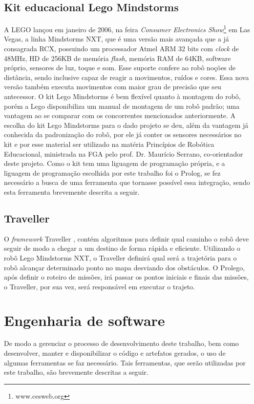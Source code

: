 \subsection{Kit educacional Lego Mindstorms}
A LEGO lançou em janeiro de 2006, na feira \textit{Consumer Electronics Show}\footnote{www.cesweb.org} em Las Vegas, a linha Mindstorms NXT, que é uma versão mais avançada que a já consagrada RCX, possuindo um processador Atmel ARM 32 bits com \textit{clock} de 48MHz, HD de 256KB de memória \textit{flash}, memória RAM de 64KB, software próprio, sensores de luz, toque e som. Esse suporte confere ao robô noções de distância, sendo inclusive capaz de reagir a movimentos, ruídos e cores. Essa nova versão também executa movimentos com maior grau de precisão que seu antecessor.
O kit Lego Mindstorms é bem flexível quanto à montagem do robô, porém a Lego disponibiliza um manual de montagem de um robô padrão; uma vantagem ao se comparar com os concorrentes mencionados anteriormente. 
A escolha do kit Lego Mindstorms para o dado projeto se deu, além da vantagem já conhecida da padronização do robô, por ele já conter os sensores necessários no kit e por esse material ser utilizado na matéria Princípios de Robótica Educacional, ministrada na FGA pelo prof. Dr. Maurício Serrano, co-orientador deste projeto. Como o kit tem uma liguagem de programação própria, e a liguagem de programação escolhida por este trabalho foi o Prolog, se fez necessário a busca de uma ferramenta que tornasse possível essa integração, sendo esta ferramenta brevemente descrita a seguir.  

\subsection{Traveller}
O \textit{framework} Traveller \cite{rinconframework}, contém algoritmos para definir qual caminho o robô deve seguir de modo a chegar a um destino de forma rápida e eficiente. Utilizando o robô Lego Mindstorms NXT, o Traveller definirá qual será a trajetória para o robô alcançar determinado ponto no mapa desviando dos obstáculos. O Prolego, após definir o roteiro de missões, irá passar os pontos iniciais e finais das missões, o Traveller, por sua vez, será responsável em executar o trajeto.

\section{Engenharia de software}
De modo a gerenciar o processo de desenvolvimento deste trabalho, bem como desenvolver, manter e disponibilizar o código e artefatos gerados, o uso de algumas ferramentas se faz necessário. Tais ferramentas, que serão utilizadas por este trabalho, são brevemente descritas a seguir.

